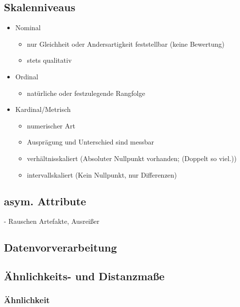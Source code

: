 \documentclass[a4paper]{article}
\begin{document}
\begin{landscape}
\begin{multicols}{3}
            \subsection{Skalenniveaus}
            \begin{itemize}[noitemsep,nolistsep,leftmargin=*]
                \item Nominal
                \begin{itemize}
                    \item nur Gleichheit oder Andersartigkeit feststellbar (keine Bewertung)
                    \item stets qualitativ
                \end{itemize}
                \item Ordinal
                \begin{itemize}
                    \item natürliche oder festzulegende Rangfolge
                \end{itemize}
                \item Kardinal/Metrisch
                \begin{itemize}
                    \item numerischer Art 
                    \item Ausprägung und Unterschied sind messbar
                    \item verhältnisskaliert (Absoluter Nullpunkt vorhanden; (Doppelt so viel.))
                    \item intervallskaliert (Kein Nullpunkt, nur Differenzen)
                \end{itemize}
            \end{itemize}
    \subsection{asym. Attribute}

    - Rauschen Artefakte, Ausreißer

    \subsection{Datenvorverarbeitung}

    \subsection{Ähnlichkeits- und Distanzmaße}
            \subsubsection{Ähnlichkeit}


\end{multicols}
\end{landscape}
\end{document}
